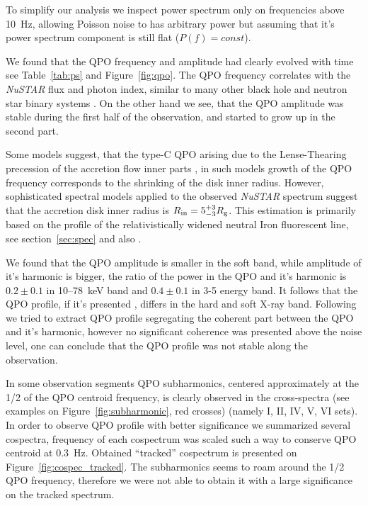 \documentclass[a4paper,fleqn,usenatbib]{mnras}
\begin{document}
To simplify our analysis we inspect power spectrum only on frequencies above 10~Hz, allowing Poisson noise to has arbitrary power but assuming that it's power spectrum component is still flat ($P(f) = const$).

We found that the QPO frequency and amplitude had clearly evolved with time see Table~\ref{tab:ps} and Figure~\ref{fig:qpo}.
The QPO frequency correlates with the {\it NuSTAR} flux and photon index, similar to many other black hole and neutron star binary systems \citep[see, e.g.,][]{2003A&A...397..729V,2003A&A...407.1039P}.
On the other hand we see, that the QPO amplitude was stable during the first half of the observation, and started to grow up in the second part.

Some models suggest, that the type-C QPO arising due to the Lense-Thearing precession of the accretion flow inner parts \citep{1998ApJ...492L..59S, 2006ApJ...642..420S, 2009MNRAS.397L.101I}, in such models growth of the QPO frequency corresponds to the shrinking of the disk inner radius.
However, sophisticated spectral models applied to the observed {\it NuSTAR} spectrum suggest that the accretion disk inner radius is $R_{\rm in}= 5_{-3}^{+3}R_{\rm g}$.
This estimation is primarily based on the profile of the relativistically widened neutral Iron fluorescent line, see section~\ref{sec:spec} and also \citep{miller15_nust}.

We found that the QPO amplitude is smaller in the soft band, while amplitude of it's harmonic is bigger, the ratio of the power in the QPO and it's harmonic is $0.2\pm0.1$ in 10--78~keV band and $0.4\pm0.1$ in 3-5 energy band.
It follows that the QPO profile, if it's presented \citep[see, e.g.][]{2015MNRAS.446.3516I}, differs in the hard and soft X-ray band.
Following \citep{2015MNRAS.446.3516I} we tried to extract  QPO profile segregating the coherent part between the QPO and it's harmonic, however no significant coherence was presented above the noise level, one can conclude that the QPO profile was not stable along the observation. 

In some observation segments QPO subharmonics, centered approximately at the 1/2 of the QPO centroid frequency, is clearly observed in the cross-spectra (see examples on Figure~\ref{fig:subharmonic}, red crosses) (namely I, II, IV, V, VI sets).
In order to observe QPO profile with better significance we summarized several cospectra, frequency of each cospectrum was scaled such a way to conserve QPO centroid at 0.3~Hz.
Obtained ``tracked'' cospectrum is presented on Figure~\ref{fig:cospec_tracked}.
The subharmonics seems to roam around the 1/2 QPO frequency, therefore we were not able to obtain it with a large significance on the tracked spectrum.
\end{document}
